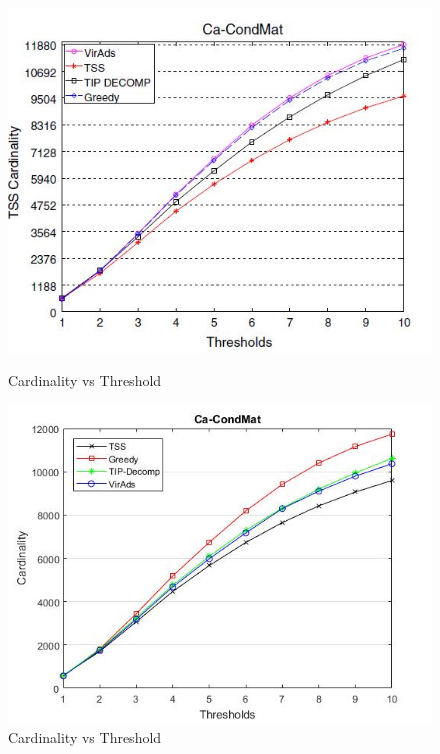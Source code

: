 \begin{figure}[h!]
\begin{minipage}[t]{0.50\textwidth}
\includegraphics[width=\linewidth,keepaspectratio=true]{images/ca-condmatpaper.jpg}
\caption{Cardinality vs Threshold}

\end{minipage}
\begin{minipage}[t]{0.50\textwidth}
\includegraphics[width=\linewidth,keepaspectratio=true]{images/ca-condmatresult.jpg}
\caption{Cardinality vs Threshold}
\end{minipage}
\end{figure}

